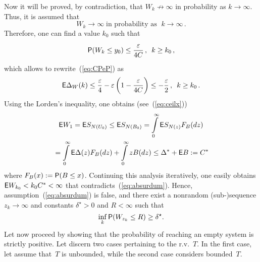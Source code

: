 \begin{multicols}{2}
Now it will be proved, by contradiction, that $W_{k}\not\to\infty$ in
probability as $k\rightarrow\infty$.    Thus, it is  assumed that
\begin{equation}
 W_{k}\to\infty\;\mbox{in probability as }\;
k\to\infty\,.\label{eq:absurdum}
\end{equation}
 Therefore, one can find a value $k_{0}$ such that 
 $$
{\sf P}(W_{k}\le y_{0})\le\displaystyle\frac{\displaystyle \varepsilon\mathstrut}{\displaystyle 4C\mathstrut}\,, \enskip k\ge k_{0}\,,
$$
 which allows to rewrite~(\ref{eq:CPeP}) as 
 \begin{equation}
{\sf  E}\Delta_{W}(k)\le
\displaystyle\frac{\displaystyle \varepsilon\mathstrut}{\displaystyle 4\mathstrut}-\varepsilon\left(1-\displaystyle\frac{\displaystyle \varepsilon\mathstrut}{\displaystyle 4C\mathstrut}\right)\le
-\displaystyle\frac{\displaystyle \varepsilon\mathstrut}{\displaystyle 2\mathstrut}\,,\enskip 
k\ge k_{0}\,.
\label{eq:EDWBound}
\end{equation} 
Using the Lorden's inequality, one 
obtains (see~(\ref{eq:ceilx}))
\begin{multline*}
{\sf E} W_1  =  {\sf E} S_{N(U_0)}\le{\sf E} S_{N (B_0)}=
\int\limits_0^\infty {\sf E} S_{N(z)}F_B(dz)\\
{}= \int\limits_0^\infty {\sf E} \Delta(z)F_B(dz)+\int\limits_{0}^{\infty}z B(dz)
\leq \Delta^{*}+{\sf E} B:= C^{*}
 \end{multline*}
where $F_B(x):={\sf P}(B\le x)$.  Continuing  this analysis iteratively, one 
easily obtains ${\sf E} W_{k_{0}}<k_{0}C^{*}<\infty$ that contradicts~(\ref{eq:absurdum}). 
Hence, assumption~(\ref{eq:absurdum}) is false, and there  
exist a nonrandom (sub-)sequence $z_{k}\to\infty$ and constants 
$\delta^\star>0$ and  $R<\infty$ such that
 \begin{equation}
\inf\limits_{k}{\sf P}(W_{z_{k}}\le R)\ge\delta^\star.
\label{eq:sequence}
\end{equation}
Let now proceed by showing that the probability of reaching an
empty system is strictly positive. Let
discern two cases pertaining to the r.v.~$T$.
In the first case, let assume that~$T$ is unbounded, while the second
case considers bounded~$T$.


\end{multicols}
